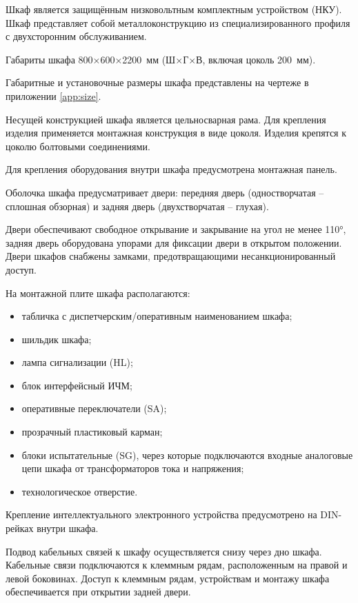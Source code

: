 \begin{enumsubsub}
\item Шкаф является защищённым низковольтным комплектным устройством (НКУ). Шкаф представляет собой металлоконструкцию из специализированного профиля с двухсторонним обслуживанием.
\item Габариты шкафа 800×600×2200~мм (Ш×Г×В, включая цоколь 200~мм).
\item Габаритные и установочные размеры шкафа представлены на чертеже в приложении \ref{app:size}.
\item Несущей конструкцией шкафа является цельносварная рама. Для крепления изделия применяется монтажная конструкция в виде цоколя. Изделия крепятся к цоколю болтовыми соединениями.
\item Для крепления оборудования внутри шкафа предусмотрена монтажная панель.
\item Оболочка шкафа предусматривает двери: передняя дверь (одностворчатая -- сплошная обзорная) и задняя дверь (двухстворчатая -- глухая).
\item Двери обеспечивают свободное открывание и закрывание на угол не менее 110°, задняя дверь оборудована упорами для фиксации двери в открытом положении. Двери шкафов снабжены замками, предотвращающими несанкционированный доступ.
\item На монтажной плите шкафа располагаются:
  \begin{itemize}
  \item табличка с диспетчерским/оперативным наименованием шкафа;
  \item шильдик шкафа;
  \item лампа сигнализации (HL);
  \item блок интерфейсный ИЧМ;
  \item оперативные переключатели (SA);
  \item прозрачный пластиковый карман;
  \item блоки испытательные (SG), через которые подключаются входные аналоговые цепи шкафа от трансформаторов тока и напряжения;
  \item технологическое отверстие.
  \end{itemize}
  Крепление интеллектуального электронного устройства предусмотрено на DIN-рейках внутри шкафа.
\item Подвод кабельных связей к шкафу осуществляется снизу через дно шкафа. Кабельные связи подключаются к клеммным рядам, расположенным на правой и левой боковинах. Доступ к клеммным рядам, устройствам и монтажу шкафа обеспечивается при открытии задней двери.

\end{enumsubsub}
